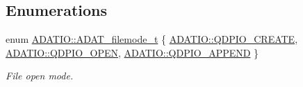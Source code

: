 \subsection*{Enumerations}
\begin{DoxyCompactItemize}
\item 
enum \mbox{\hyperlink{group__qio_ga669520ca9003997be838730beef322b4}{A\+D\+A\+T\+I\+O\+::\+A\+D\+A\+T\+\_\+filemode\+\_\+t}} \{ \mbox{\hyperlink{group__qio_gga669520ca9003997be838730beef322b4a26364b4509b37147465990b221a87326}{A\+D\+A\+T\+I\+O\+::\+Q\+D\+P\+I\+O\+\_\+\+C\+R\+E\+A\+TE}}, 
\mbox{\hyperlink{group__qio_gga669520ca9003997be838730beef322b4a700314a4acc8fad5ceb1e154792e27c9}{A\+D\+A\+T\+I\+O\+::\+Q\+D\+P\+I\+O\+\_\+\+O\+P\+EN}}, 
\mbox{\hyperlink{group__qio_gga669520ca9003997be838730beef322b4a3f4180520ebc75ea34f783aaea3ec69b}{A\+D\+A\+T\+I\+O\+::\+Q\+D\+P\+I\+O\+\_\+\+A\+P\+P\+E\+ND}}
 \}
\begin{DoxyCompactList}\small\item\em File open mode. \end{DoxyCompactList}\end{DoxyCompactItemize}
